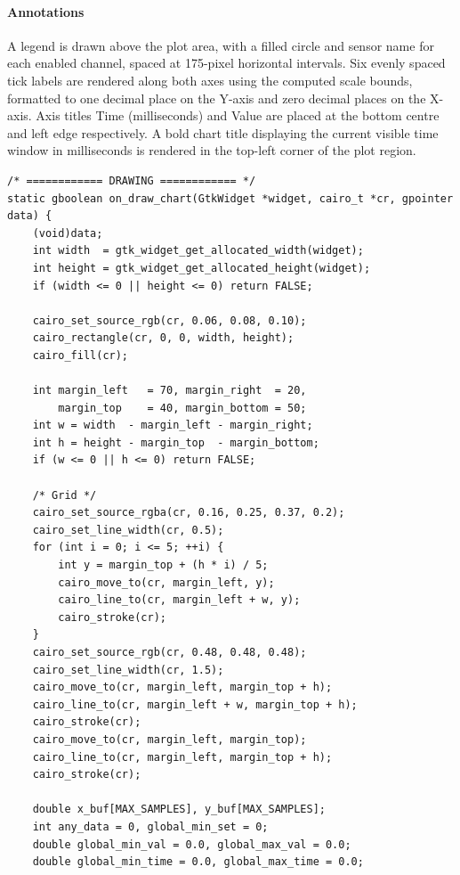 \paragraph{Annotations}
A legend is drawn above the plot area, with a filled circle and sensor
name for each enabled channel, spaced at 175-pixel horizontal intervals.
Six evenly spaced tick labels are rendered along both axes using the
computed scale bounds, formatted to one decimal place on the Y-axis and
zero decimal places on the X-axis. Axis titles Time (milliseconds)
and Value are placed at the bottom centre and left edge
respectively. A bold chart title displaying the current visible time
window in milliseconds is rendered in the top-left corner of the plot
region.

\begin{verbatim}
/* ============ DRAWING ============ */
static gboolean on_draw_chart(GtkWidget *widget, cairo_t *cr, gpointer data) {
    (void)data;
    int width  = gtk_widget_get_allocated_width(widget);
    int height = gtk_widget_get_allocated_height(widget);
    if (width <= 0 || height <= 0) return FALSE;

    cairo_set_source_rgb(cr, 0.06, 0.08, 0.10);
    cairo_rectangle(cr, 0, 0, width, height);
    cairo_fill(cr);

    int margin_left   = 70, margin_right  = 20,
        margin_top    = 40, margin_bottom = 50;
    int w = width  - margin_left - margin_right;
    int h = height - margin_top  - margin_bottom;
    if (w <= 0 || h <= 0) return FALSE;

    /* Grid */
    cairo_set_source_rgba(cr, 0.16, 0.25, 0.37, 0.2);
    cairo_set_line_width(cr, 0.5);
    for (int i = 0; i <= 5; ++i) {
        int y = margin_top + (h * i) / 5;
        cairo_move_to(cr, margin_left, y);
        cairo_line_to(cr, margin_left + w, y);
        cairo_stroke(cr);
    }
    cairo_set_source_rgb(cr, 0.48, 0.48, 0.48);
    cairo_set_line_width(cr, 1.5);
    cairo_move_to(cr, margin_left, margin_top + h);
    cairo_line_to(cr, margin_left + w, margin_top + h);
    cairo_stroke(cr);
    cairo_move_to(cr, margin_left, margin_top);
    cairo_line_to(cr, margin_left, margin_top + h);
    cairo_stroke(cr);

    double x_buf[MAX_SAMPLES], y_buf[MAX_SAMPLES];
    int any_data = 0, global_min_set = 0;
    double global_min_val = 0.0, global_max_val = 0.0;
    double global_min_time = 0.0, global_max_time = 0.0;


\end{verbatim}
